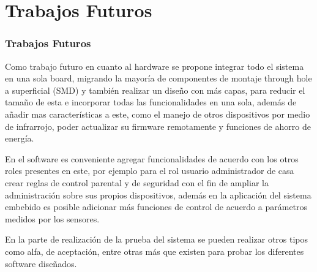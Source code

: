 \section{Trabajos Futuros}
\begin{frame}[t]
\frametitle{Trabajos Futuros}
\small
Como trabajo futuro en cuanto al hardware se propone integrar todo el sistema en una sola board, migrando la mayoría de componentes de montaje through hole a superficial (SMD) y también realizar un diseño con más capas, para reducir el tamaño de esta e incorporar todas las funcionalidades en una sola, además de añadir mas características a este, como el manejo de otros dispositivos por medio de infrarrojo, poder actualizar su firmware remotamente y funciones de ahorro de energía.\newline

En el software es conveniente agregar funcionalidades de acuerdo con los otros roles presentes en este, por ejemplo para el rol usuario administrador de casa crear reglas de control parental y de seguridad con el fin de ampliar la administración sobre sus propios dispositivos, además en la aplicación del sistema embebido es posible adicionar más funciones de control de acuerdo a parámetros medidos por los sensores.\newline

En la parte de realización de la prueba del sistema se pueden realizar otros tipos como alfa, de aceptación, entre otras más que existen para probar los diferentes software diseñados.

\end{frame}
